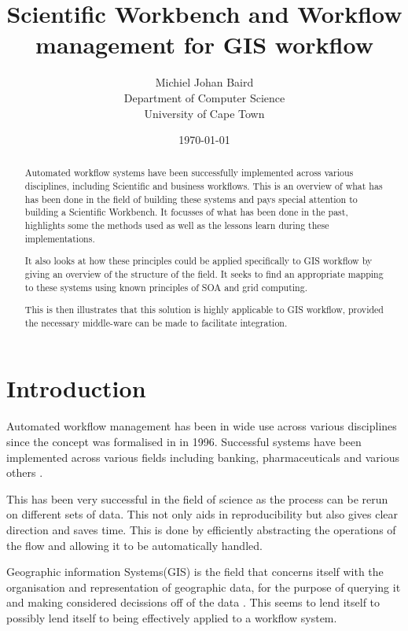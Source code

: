 \documentclass[11pt,twocolumn]{article}
\title{Scientific Workbench and Workflow management for GIS workflow}
\author{
    Michiel Johan Baird \\
        Department of Computer Science \\
        University of Cape Town
}
\date{\today}
\begin{document}
\maketitle
\begin{abstract}
    Automated workflow systems have been successfully implemented
    across various disciplines, including Scientific and business
    workflows. This is an overview of what has has been done
    in the field of building these systems and pays special attention
    to building a Scientific Workbench. It focusses of what
    has been done in the past, highlights some the methods used
    as well as the lessons learn during these implementations.

    It also looks at how these principles could be applied
    specifically to GIS workflow by giving an overview of the
    structure of the field. It seeks to find an appropriate
    mapping to these systems using known principles of SOA and
    grid computing.

    This is then illustrates that this solution is highly applicable
    to GIS workflow, provided the necessary middle-ware can be made
    to facilitate integration.
\end{abstract}
\section{Introduction}
    Automated workflow management has been in wide use across
    various disciplines since the concept was formalised in in
    1996\cite{springerlink:10.1007/BF00136712}. Successful systems
    have been implemented across various fields including banking,
    pharmaceuticals and various others
    \cite{Brahe:2007:SWW:1316624.1316661,5407993}.

    This has been very successful in the field of science as
    the process can be rerun on different sets of data.\cite{4721191}
    This not only aids in reproducibility but also gives
    clear direction and saves time. This is done by efficiently
    abstracting the operations of the flow and allowing it
    to be automatically handled.

    Geographic information Systems(GIS) is the field that
    concerns itself with the organisation and representation
    of geographic data, for the purpose of querying it and
    making considered decissions off of the data
    \cite{DiMartino:2007:TAG:1341012.1341081}. This
    seems to lend itself to possibly lend itself to being
    effectively applied to a workflow system.
\end{document}
